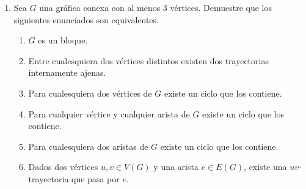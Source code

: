 \documentclass{article}
\begin{document}
\begin{enumerate}
\begin{proof}
    De igual forma existira algun $b_r$ para alguna r que pertenece a los naturales, tal que $b_r \in$ X, pero $b_{r+1} \notin $ X por lo que ahora  Q'$=(x' =b_r, b_{r+1}, b_{r+2}, ..., b_k = y')$.
    
    Ahora definamos $P'^{-1}$ como $(y'=a_n, a_{n-1}, a_{n-2}, ..., a_i=x')$ y $Q'^{-1}$ como $(y'=b_k, b_{k-1}, b_{k-2}, ..., b_r=x') \Leftrightarrow$ aplicando el razonamiento anterior,  existira t que pertenenzca los naturales, tal que $b_{k-t} \in Y$ y $b_{k-(t+1)} \notin Y$  y de igual forma existiara s que pertenezca a los naturales tal que $a_{n-s} \in Y$ y  $a_{n-(s+1)} \notin Y \Leftrightarrow$ definamos a $P=(a_i, a_{i+1}, ...., a_{n-s})$ y definimos a $Q=(b_j, b_{j+1}, ..., b_{k-t})$
    
    Por lo tanto: 
    
    a) se cumple ya que $a_i$ y $b_j$ pertenencen a X por construccion de nuetras trayectorias P y Q.
    
    b) se cumple ya que $a_{n-r}$ y $b_{k-t}$ pertenencen a Y por construccion de P y Q.
    
    c) se cumple de nuevo por construccion de P y Q y ya que X y Y son conjuntos disjuntos de V
    
    \end{proof}

\item Sea $G$ una gr\'afica conexa con al menos 3 v\'ertices. Demuestre que
  los siguientes enunciados son equivalentes.
  \begin{enumerate}
  \item $G$ es un bloque.

  \item Entre cualesquiera dos v\'ertices distintos existen dos trayectorias
    internamente ajenas.

  \item Para cualesquiera dos v\'ertices de $G$ existe un ciclo que los
    contiene.

  \item Para cualquier v\'ertice y cualquier arista de $G$ existe un ciclo
    que los contiene.

  \item Para cualesquiera dos aristas de $G$ existe un ciclo que los
    contiene.

  \item Dados dos v\'ertices $u,v \in V(G)$ y una arista $e \in E(G)$,
    existe una $uv$-trayectoria que pasa por $e$.


\end{enumerate}
\end{enumerate}
\end{document}
